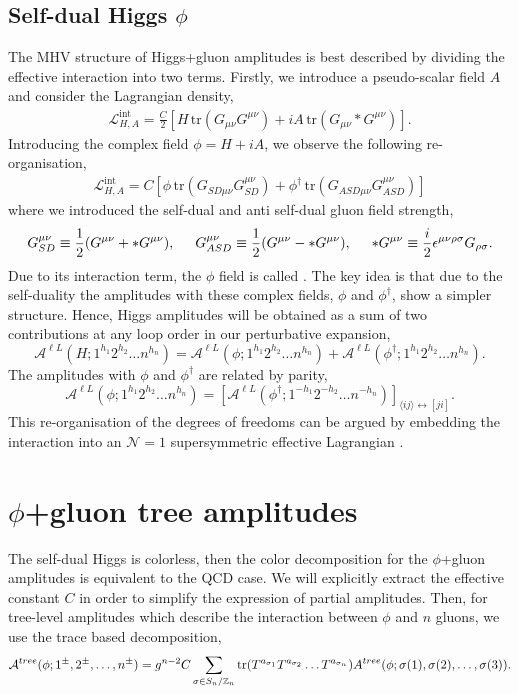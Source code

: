 \subsection{Self-dual Higgs $\phi$}
The MHV structure of Higgs+gluon amplitudes is best described by dividing the effective interaction into two terms. Firstly, we introduce a pseudo-scalar field $A$ and consider the Lagrangian density,
\begin{align*}
	\mathcal{L}^{\text{int}}_{H,A}=\frac{C}{2}\left[H\, \text{tr}\left( G_{\mu\nu}G^{\mu\nu}\right)+iA\,\text{tr}\left( G_{\mu\nu}*G^{\mu\nu}\right)\right].
\end{align*}
Introducing the complex field $\phi=H+iA$, we observe the following re-organisation,
\begin{align}
\mathcal{L}^{\text{int}}_{H,A}=C\left[\phi\, \text{tr}\left( G_{SD\mu\nu}G_{SD}^{\mu\nu}\right)+\phi^\dagger\, \text{tr}\left( G_{ASD\mu\nu}G_{ASD}^{\mu\nu}\right)\right]	\label{lagrangian}
\end{align}
where we introduced the self-dual and anti self-dual gluon field strength,
\begin{align*}
	G_{SD}^{\mu\nu}\equiv\frac{1}{2}(G^{\mu\nu}+*G^{\mu\nu}),\hspace{0.5cm}G_{ASD}^{\mu\nu}\equiv\frac{1}{2}(G^{\mu\nu}-*G^{\mu\nu}), \hspace{0.5cm} *G^{\mu\nu}\equiv \frac{i}{2}\epsilon^{\mu\nu\rho\sigma} G_{\rho\sigma}.
\end{align*}
Due to its interaction term, the $\phi$ field is called . The key idea is that due to the self-duality the amplitudes with these complex fields, $\phi$ and $\phi^\dagger$, show a simpler structure. Hence, Higgs amplitudes will be obtained as a sum of two contributions at any loop order in our perturbative expansion,
$$
	\mathcal{A}^{\ell L}(H; 1^{h_1}2^{h_2}\dots n^{h_n}) =\mathcal{A}^{\ell L}(\phi; 1^{h_1}2^{h_2}\dots n^{h_n}) +\mathcal{A}^{\ell L}(\phi^\dagger; 1^{h_1}2^{h_2}\dots n^{h_n}). 
$$
The amplitudes with $\phi$ and $\phi^\dagger$ are related by parity,
$$
	\mathcal{A}^{\ell L}(\phi; 1^{h_1}2^{h_2}\dots n^{h_n})=\left[\mathcal{A}^{\ell L}(\phi^\dagger; 1^{-h_1}2^{-h_2}\dots n^{-h_n})\right]_{\langle ij \rangle \leftrightarrow [ji]}.
$$
This re-organisation of the degrees of freedoms can be argued by embedding the interaction into an $\mathcal{N}=1$ supersymmetric effective Lagrangian \cite{Dixon_2004}.
\section{$\phi$+gluon tree amplitudes}
The self-dual Higgs is colorless, then the color decomposition for the $\phi$+gluon amplitudes is equivalent to the QCD case. We will explicitly extract the effective constant $C$ in order to simplify the expression of partial amplitudes. Then, for tree-level amplitudes which describe the interaction between $\phi$ and $n$ gluons, we use the trace based decomposition,
\begin{align*}
	\mathcal{A}^{tree}(\phi; 1^\pm, 2^\pm, \dots, n^\pm)=g^{n-2} C \sum_{\sigma\in S_n /\mathbb{Z}_n} \tr(T^{a_{\sigma_1}}T^{a_{\sigma_2}}\dots T^{a_{\sigma_n}}) A^{tree}(\phi;\sigma(1),\sigma(2),\dots, \sigma(3)).
\end{align*}
